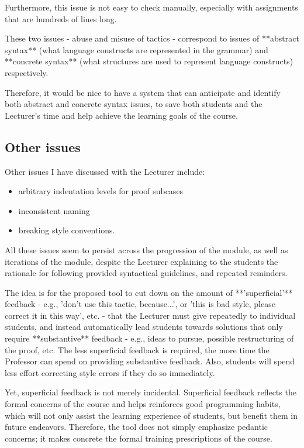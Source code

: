 Furthermore, this issue is not easy to check manually, especially with assignments that are hundreds of lines long.

These two issues - abuse and misuse of tactics - correspond to issues of **abstract syntax** (what language constructs are represented in the grammar) and **concrete syntax** (what structures are used to represent language constructs) respectively. 

Therefore, it would be nice to have a system that can anticipate and identify both abstract and concrete syntax issues, to save both students and the Lecturer's time and help achieve the learning goals of the course.   


\subsection{Other issues}
Other issues I have discussed with the Lecturer include: 
\begin{itemize}
  \item arbitrary indentation levels for proof subcases 
  \item inconsistent naming
  \item breaking style conventions. 
\end{itemize}


All these issues seem to persist across the progression of the module, as well as iterations of the module, despite the Lecturer explaining to the students the rationale for following provided syntactical guidelines, and repeated reminders.

The idea is for the proposed tool to cut down on the amount of **'superficial'** feedback - e.g., 'don't use this tactic, because...', or 'this is bad style, please correct it in this way', etc. - that the Lecturer must give repeatedly to individual students, and instead automatically lead students towards solutions that only require **substantive** feedback - e.g., ideas to pursue, possible restructuring of the proof, etc. The less superficial feedback is required, the more time the Professor can spend on providing substantive feedback. Also, students will spend less effort correcting style errors if they do so immediately.

Yet, superficial feedback is not merely incidental. Superficial feedback reflects the formal concerns of the course and helps reinforces good programming habits, which will not only assist the learning experience of students, but benefit them in future endeavors. Therefore, the tool does not simply emphasize pedantic concerns; it makes concrete the formal training prescriptions of the course. 